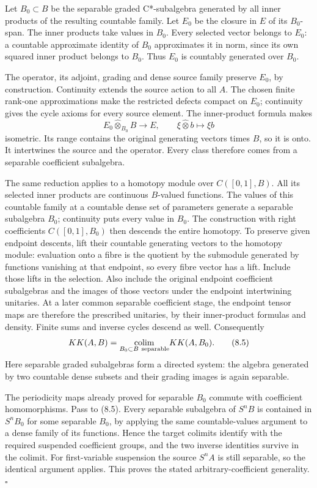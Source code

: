 \documentclass[
  11pt,
]{article}
\begin{document}
Let \(B_0\subset B\) be the separable graded C*-subalgebra generated by
all inner products of the resulting countable family. Let \(E_0\) be the
closure in \(E\) of its \(B_0\)-span. The inner products take values in
\(B_0\). Every selected vector belongs to \(E_0\): a countable
approximate identity of \(B_0\) approximates it in norm, since its own
squared inner product belongs to \(B_0\). Thus \(E_0\) is countably
generated over \(B_0\).

The operator, its adjoint, grading and dense source family preserve
\(E_0\), by construction. Continuity extends the source action to all
\(A\). The chosen finite rank-one approximations make the restricted
defects compact on \(E_0\); continuity gives the cycle axioms for every
source element. The inner-product formula makes \[
E_0\widehat\otimes_{B_0}B\longrightarrow E,\qquad
\xi\widehat\otimes b\longmapsto\xi b
\tag{8.4}
\] isometric. Its range contains the original generating vectors times
\(B\), so it is onto. It intertwines the source and the operator. Every
class therefore comes from a separable coefficient subalgebra.

The same reduction applies to a homotopy module over \(C([0,1],B)\). All
its selected inner products are continuous \(B\)-valued functions. The
values of this countable family at a countable dense set of parameters
generate a separable subalgebra \(B_0\); continuity puts every value in
\(B_0\). The construction with right coefficients \(C([0,1],B_0)\) then
descends the entire homotopy. To preserve given endpoint descents, lift
their countable generating vectors to the homotopy module: evaluation
onto a fibre is the quotient by the submodule generated by functions
vanishing at that endpoint, so every fibre vector has a lift. Include
those lifts in the selection. Also include the original endpoint
coefficient subalgebras and the images of those vectors under the
endpoint intertwining unitaries. At a later common separable coefficient
stage, the endpoint tensor maps are therefore the prescribed unitaries,
by their inner-product formulas and density. Finite sums and inverse
cycles descend as well. Consequently \[
KK(A,B)=\underset{B_0\subset B\ {\rm separable}}{\operatorname{colim}}KK(A,B_0).
\tag{8.5}
\] Here separable graded subalgebras form a directed system: the algebra
generated by two countable dense subsets and their grading images is
again separable.

The periodicity maps already proved for separable \(B_0\) commute with
coefficient homomorphisms. Pass to (8.5). Every separable subalgebra of
\(S^nB\) is contained in \(S^nB_0\) for some separable \(B_0\), by
applying the same countable-values argument to a dense family of its
functions. Hence the target colimits identify with the required
suspended coefficient groups, and the two inverse identities survive in
the colimit. For first-variable suspension the source \(S^nA\) is still
separable, so the identical argument applies. This proves the stated
arbitrary-coefficient generality. \(\square\)
\end{document}
